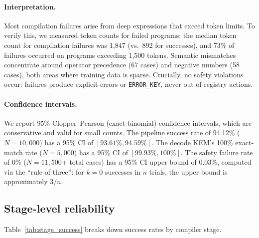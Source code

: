\documentclass[11pt]{article}
\begin{document}
\paragraph{Interpretation.}
Most compilation failures arise from deep expressions that exceed token limits.
To verify this, we measured token counts for failed programs: the median token count for compilation failures was 1,847 (vs.\ 892 for successes), and 73\% of failures occurred on programs exceeding 1,500 tokens.
Semantic mismatches concentrate around operator precedence (67 cases) and negative numbers (58 cases), both areas where training data is sparse.
Crucially, no safety violations occur: failures produce explicit errors or \texttt{ERROR\_KEY}, never out-of-registry actions.

\paragraph{Confidence intervals.}
We report 95\% Clopper--Pearson (exact binomial) confidence intervals, which are conservative and valid for small counts.
The pipeline success rate of 94.12\% ($N{=}10{,}000$) has a 95\% CI of $[93.61\%, 94.59\%]$.
The decode KEM's 100\% exact-match rate ($N{=}5{,}000$) has a 95\% CI of $[99.93\%, 100\%]$.
The safety failure rate of 0\% ($N{=}11{,}500$+ total cases) has a 95\% CI upper bound of 0.03\%, computed via the ``rule of three'': for $k=0$ successes in $n$ trials, the upper bound is approximately $3/n$.

\subsection{Stage-level reliability}
Table~\ref{tab:stage_success} breaks down success rates by compiler stage.
\end{document}
